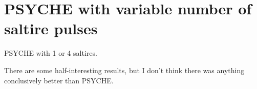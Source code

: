 \section{PSYCHE with variable number of saltire pulses}
\label{sec:pureshift__nsaltire}

PSYCHE with 1 or 4 saltires.

There are some half-interesting results, but I don't think there was anything conclusively better than PSYCHE.
